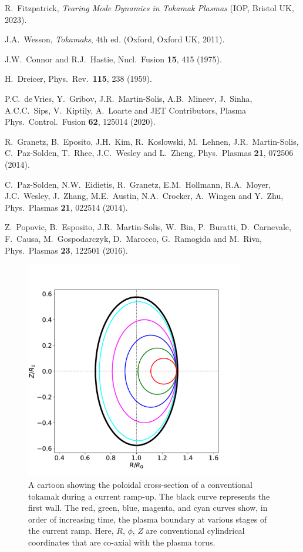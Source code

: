\documentclass[12pt,prb,aps]{revtex4-1}
\begin{document}
\begin{thebibliography}{99}
 R.~Fitzpatrick, {\em Tearing Mode Dynamics in Tokamak Plasmas}\/ (IOP, Bristol UK, 2023).

 J.A.~Wesson, {\em Tokamaks}, 4th ed. (Oxford, Oxford UK, 2011).

 J.W.~Connor and R.J.~Hastie, Nucl.\ Fusion {\bf 15}, 415 (1975).

 H.~Dreicer, Phys.\ Rev.\ {\bf 115}, 238 (1959).

 P.C.~de\,Vries, Y.~Gribov, J.R.~Martin-Solis, A.B.~Mineev, J.~Sinha, A.C.C.~Sips, V.~Kiptily, A.~Loarte and JET Contributors, Plasma Phys.\ Control.\ Fusion
{\bf 62}, 125014 (2020). 

 R.~Granetz, B.~Eposito, J.H.~Kim, R.~Koslowski, M.~Lehnen, J.R.~Martin-Solis, C.~Paz-Solden, T.~Rhee, J.C.~Wesley
and L.~Zheng, Phys.\ Plasmas {\bf 21}, 072506 (2014).

 C.~Paz-Solden,  N.W.~Eidietis,  R.~Granetz, E.M.~Hollmann, R.A.~Moyer, J.C.~Wesley, J.~Zhang, M.E.~Austin, N.A.~Crocker, A.~Wingen and Y.~Zhu, 
 Phys.\ Plasmas {\bf 21}, 022514 (2014).

 Z.~Popovic, B.~Esposito, J.R.~Martin-Solis, W.~Bin,  P.~Buratti, D.~Carnevale, F.~Causa, M.~Gospodarczyk,
D.~Marocco, G.~Ramogida and M.~Riva, Phys.\ Plasmas {\bf 23}, 122501 (2016). 

\end{thebibliography}

\begin{figure}
\centerline{\includegraphics[width=0.85\textwidth]{Figure1.pdf}}
\caption{A cartoon showing the poloidal cross-section of a conventional tokamak during a current ramp-up. The black curve represents the first wall. The
red, green, blue, magenta, and cyan curves show, in order of increasing time, the plasma boundary at various stages of the current ramp.
Here, $R$, $\phi$, $Z$ are conventional cylindrical coordinates that are co-axial with the plasma torus. \label{fig1}}
\end{figure}
\end{document}
